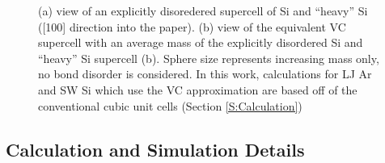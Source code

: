 \documentclass[aps,prb,onecolumn,preprint,superscriptaddress,amsmath,amssymb,floatfix]{revtex4}
\begin{document}
% 

\begin{figure}
\begin{center}
\mbox{}
\vspace*{0mm}
\end{center}
\caption{\label{F:supercells} 
(a) view of an explicitly disoredered supercell of 
Si and ``heavy'' Si ([100] direction into the paper).
\cite{momma_vesta:_2008} 
(b) view of the equivalent VC supercell 
with an average
mass of the explicitly disordered Si and ``heavy'' Si supercell 
(b). 
Sphere size represents 
increasing mass 
only, no bond disorder is considered. 
In this work, calculations for LJ Ar and SW Si which use the VC 
approximation 
are based off of the conventional cubic unit cells 
(Section \ref{S:Calculation}) 
}
\end{figure}


\clearpage

\subsection{\label{S:Calculation}Calculation and Simulation Details}
\end{document}
